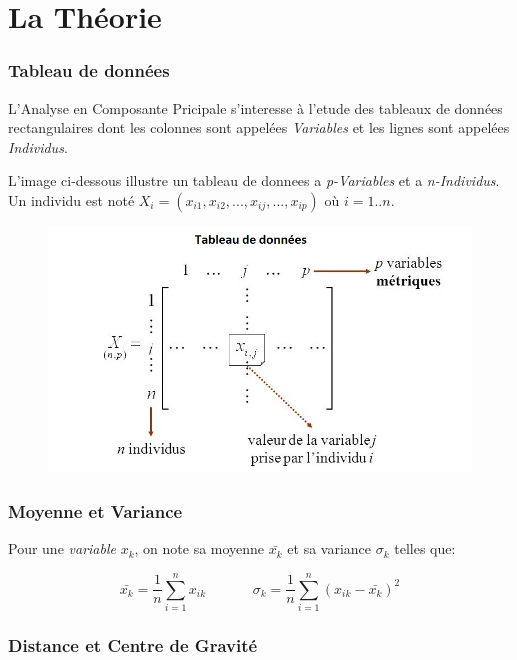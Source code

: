 \documentclass{article}
\begin{document}
\section{La Théorie}

\subsubsection{Tableau de données}

L'Analyse en Composante Pricipale s'interesse à l'etude des tableaux de données rectangulaires dont les colonnes sont appelées \textit{Variables} et les lignes sont appelées \textit{Individus}.
\newline

L'image ci-dessous illustre un tableau de donnees a \textit{p-Variables} et a \textit{n-Individus}. Un individu est noté $X_i=(x_{i1},x_{i2}, ... ,x_{ij}, ... ,x_{ip})$ où $i=1..n$.

\begin{figure}[h!]
\includegraphics[width=\linewidth]{images/tableau.png}
\end{figure}

\subsubsection{Moyenne et Variance}

Pour une \textit{variable} ${x_k}$, on note sa moyenne $\bar{x_k}$ et sa variance $\sigma_k$ telles que:

\begin{equation*}
\bar{x_k}=\frac{1}{n}\sum_{i=1}^{n}{x_{ik}} \;\;\;\;\;\;\;\;\;\;\;\; \sigma_k=\frac{1}{n}\sum_{i=1}^{n}{(x_{ik}-\bar{x_{k}})^2}
\end{equation*}

\subsubsection{Distance et Centre de Gravité}
\end{document}
